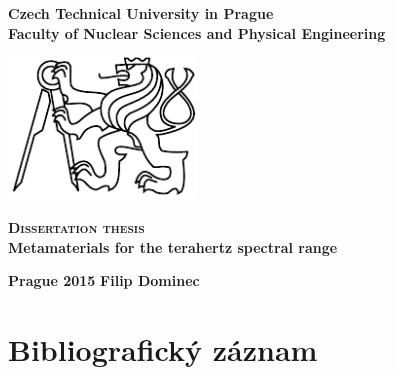 \begin{center}
	\Large{\textbf{
Czech Technical University in Prague\\
Faculty of Nuclear Sciences and Physical Engineering\\ 
}}
 \vspace{3cm}

\includegraphics[width=5cm]{img/LogoCVUT}
\vspace{2cm}

\huge{\textbf{\scshape Dissertation thesis}}\\
\vspace{5mm}
{\LARGE\textbf{Metamaterials for the terahertz spectral range\\}}
\end{center}

\date{ } 			


 \vfill
\begin{minipage}{.99\textwidth}
\Large{\textbf{Prague 2015}} \hfill \Large{\textbf{Filip Dominec}}
\end{minipage}


\thispagestyle{empty} \newpage \setcounter{page}{1}

\chapter*{Bibliografický záznam}

